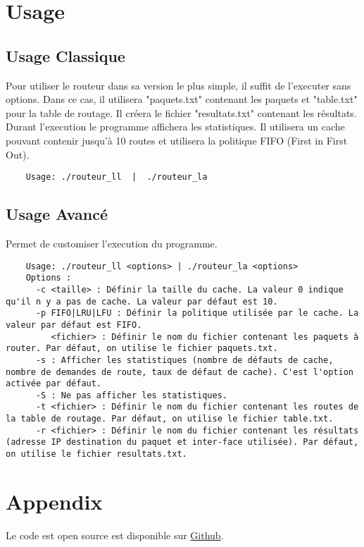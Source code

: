 \documentclass{article}
\begin{document}
\section{Usage}
\subsection{Usage Classique}
Pour utiliser le routeur dans sa version le plus simple, il suffit de l'executer sans options. Dans ce cas, il utilisera "paquets.txt" contenant les paquets et "table.txt" pour la table de routage. Il créera le fichier "resultats.txt" contenant les résultats. Durant l'execution le programme affichera les statistiques. Il utilisera un cache pouvant contenir jusqu'à 10 routes et utilisera la politique FIFO (First in First Out). 
\begin{verbatim}
    Usage: ./routeur_ll  |  ./routeur_la
\end{verbatim}

\subsection{Usage Avancé}
Permet de customiser l'execution du programme.
\begin{verbatim}
    Usage: ./routeur_ll <options> | ./routeur_la <options>
    Options :
      -c <taille> : Définir la taille du cache. La valeur 0 indique qu'il n y a pas de cache. La valeur par défaut est 10.
      -p FIFO|LRU|LFU : Définir la politique utilisée par le cache. La valeur par défaut est FIFO.
         <fichier> : Définir le nom du fichier contenant les paquets à router. Par défaut, on utilise le fichier paquets.txt.
      -s : Afficher les statistiques (nombre de défauts de cache, nombre de demandes de route, taux de défaut de cache). C'est l'option activée par défaut.
      -S : Ne pas afficher les statistiques.
      -t <fichier> : Définir le nom du fichier contenant les routes de la table de routage. Par défaut, on utilise le fichier table.txt.
      -r <fichier> : Définir le nom du fichier contenant les résultats (adresse IP destination du paquet et inter-face utilisée). Par défaut, on utilise le fichier resultats.txt.
\end{verbatim}

\section{Appendix}
Le code est open source est disponible sur \href{http://www.github.com/Absobel/PIM_Project}{Github}.
\end{document}
